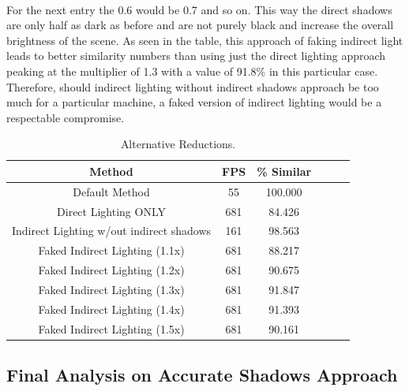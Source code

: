 \paragraph{}
For the next entry the 0.6 would be 0.7 and so on.  This way the direct shadows are only half as dark as before and are not purely black and increase the overall brightness of the scene.  As seen in the table, this approach of faking indirect light leads to better similarity numbers than using just the direct lighting approach peaking at the multiplier of 1.3 with a value of 91.8\% in this particular case.  Therefore, should indirect lighting without indirect shadows approach be too much for a particular machine, a faked version of indirect lighting would be a respectable compromise.
\vspace{5 mm}
\begin{table}[h!]\centering
	\caption{Alternative Reductions.}
	\begin{center}
	    \begin{tabular}{ | c | c | c | c | c | c |}
	    \hline
	    Method & FPS & \% Similar\\ \hline
	    Default Method & 55 & 100.000\\ \hline
	    Direct Lighting ONLY & 681 & 84.426\\ \hline
	    Indirect Lighting w/out indirect shadows & 161 & 98.563\\ \hline
	    Faked Indirect Lighting (1.1x) & 681 & 88.217\\ \hline
	    Faked Indirect Lighting (1.2x) & 681 & 90.675\\ \hline
	    Faked Indirect Lighting (1.3x) & 681 & 91.847\\ \hline
	    Faked Indirect Lighting (1.4x) & 681 & 91.393\\ \hline
	    Faked Indirect Lighting (1.5x) & 681 & 90.161\\ \hline
	    \end{tabular}
	\end{center}
	\label{table:5.9}
\end{table}

\subsection{Final Analysis on Accurate Shadows Approach} \label{sec:finalAnalysis}
